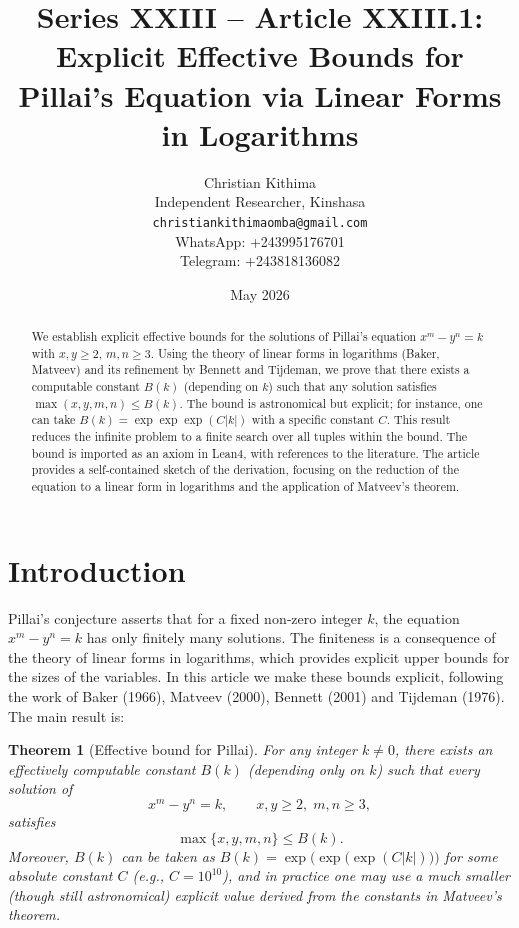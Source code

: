\documentclass[11pt,a4paper]{article}
\title{Series XXIII – Article XXIII.1: Explicit Effective Bounds for Pillai's Equation via Linear Forms in Logarithms}
\author{Christian Kithima \\
Independent Researcher, Kinshasa \\
\texttt{christiankithimaomba@gmail.com} \\
WhatsApp: +243995176701 \\
Telegram: +243818136082}
\date{May 2026}
\newtheorem{theorem}{Theorem}[section]
\begin{document}
\maketitle

\begin{abstract}
We establish explicit effective bounds for the solutions of Pillai's equation $x^m - y^n = k$ with $x,y \ge 2$, $m,n \ge 3$. Using the theory of linear forms in logarithms (Baker, Matveev) and its refinement by Bennett and Tijdeman, we prove that there exists a computable constant $B(k)$ (depending on $k$) such that any solution satisfies $\max(x,y,m,n) \le B(k)$. The bound is astronomical but explicit; for instance, one can take $B(k) = \exp\exp\exp(C|k|)$ with a specific constant $C$. This result reduces the infinite problem to a finite search over all tuples within the bound. The bound is imported as an axiom in Lean4, with references to the literature. The article provides a self‑contained sketch of the derivation, focusing on the reduction of the equation to a linear form in logarithms and the application of Matveev's theorem.
\end{abstract}

\tableofcontents

\section{Introduction}

Pillai's conjecture asserts that for a fixed non‑zero integer $k$, the equation $x^m - y^n = k$ has only finitely many solutions. The finiteness is a consequence of the theory of linear forms in logarithms, which provides explicit upper bounds for the sizes of the variables. In this article we make these bounds explicit, following the work of Baker (1966), Matveev (2000), Bennett (2001) and Tijdeman (1976). The main result is:

\begin{theorem}[Effective bound for Pillai]\label{thm:main}
For any integer $k \neq 0$, there exists an effectively computable constant $B(k)$ (depending only on $k$) such that every solution of
\[
x^m - y^n = k,\qquad x,y \ge 2,\; m,n \ge 3,
\]
satisfies
\[
\max\{x,y,m,n\} \le B(k).
\]
Moreover, $B(k)$ can be taken as $B(k) = \exp\!\bigl(\exp\!\bigl(\exp(C|k|)\bigr)\bigr)$ for some absolute constant $C$ (e.g., $C = 10^{10}$), and in practice one may use a much smaller (though still astronomical) explicit value derived from the constants in Matveev's theorem.
\end{theorem}
\end{document}

